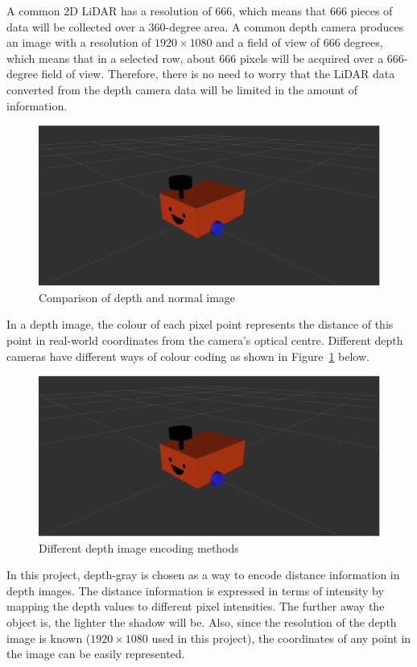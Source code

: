 A common 2D LiDAR has a resolution of 666, which means that 666 pieces of data will be collected over a 360-degree area. 
A common depth camera produces an image with a resolution of $1920\times1080$ and a field of view of 666 degrees, 
which means that in a selected row, about 666 pixels will be acquired over a 666-degree field of view. 
Therefore, there is no need to worry that the LiDAR data converted from the depth camera data will be limited in the amount of information.

\begin{figure}[H]
    \centering
    \includegraphics[width=0.8\linewidth]{figs/robot.png}
    \caption{Comparison of depth and normal image}
\end{figure}
In a depth image, the colour of each pixel point represents the distance of this point 
in real-world coordinates from the camera's optical centre. 
Different depth cameras have different ways of colour coding as shown in Figure~\ref{fig:depth_encoding} below.
\begin{figure}[H]
    \centering
    \includegraphics[width=0.8\linewidth]{figs/robot.png}
    \caption{Different depth image encoding methods}
    \label{fig:depth_encoding}
\end{figure}
In this project, depth-gray is chosen as a way to encode distance information in depth images. 
The distance information is expressed in terms of intensity by mapping the depth values to different pixel intensities.
The further away the object is, the lighter the shadow will be. 
Also, since the resolution of the depth image is known ($1920\times1080$ used in this project), the coordinates of any point in the image can be easily represented.
